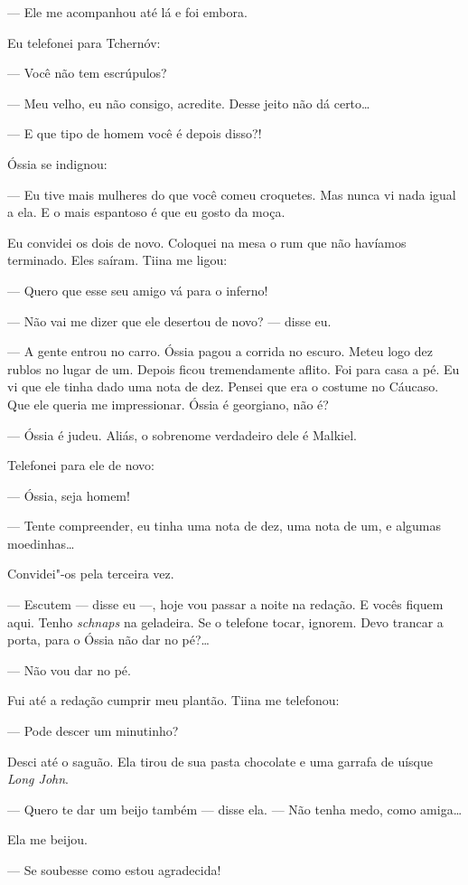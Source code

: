 --- Ele me acompanhou até lá e foi embora.

Eu telefonei para Tchernóv:

--- Você não tem escrúpulos?

--- Meu velho, eu não consigo, acredite. Desse jeito não dá certo\ldots{}

--- E que tipo de homem você é depois disso?!

Óssia se indignou:

--- Eu tive mais mulheres do que você comeu croquetes. Mas nunca vi nada
igual a ela. E o mais espantoso é que eu gosto da moça.

Eu convidei os dois de novo. Coloquei na mesa o rum que não havíamos
terminado. Eles saíram. Tiina me ligou:

--- Quero que esse seu amigo vá para o inferno!

--- Não vai me dizer que ele desertou de novo? --- disse eu.

--- A gente entrou no carro. Óssia pagou a corrida no escuro. Meteu logo
dez rublos no lugar de um. Depois ficou tremendamente aflito. Foi para
casa a pé. Eu vi que ele tinha dado uma nota de dez. Pensei que era o
costume no Cáucaso. Que ele queria me impressionar. Óssia é georgiano,
não é?

--- Óssia é judeu. Aliás, o sobrenome verdadeiro dele é Malkiel.

Telefonei para ele de novo:

--- Óssia, seja homem!

--- Tente compreender, eu tinha uma nota de dez, uma nota de um, e
algumas moedinhas\ldots{}

Convidei"-os pela terceira vez.

--- Escutem --- disse eu ---, hoje vou passar a noite na redação. E
vocês fiquem aqui. Tenho \emph{schnaps} na geladeira. Se o telefone
tocar, ignorem. Devo trancar a porta, para o Óssia não dar no pé?\ldots{}

--- Não vou dar no pé.

Fui até a redação cumprir meu plantão. Tiina me telefonou:

--- Pode descer um minutinho?

Desci até o saguão. Ela tirou de sua pasta chocolate e uma garrafa
de uísque \emph{Long John}.

--- Quero te dar um beijo também --- disse ela. --- Não tenha medo, como
amiga\ldots{}

Ela me beijou.

--- Se soubesse como estou agradecida!

